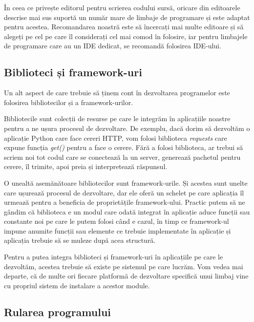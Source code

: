 În ceea ce privește editorul pentru scrierea codului sursă, oricare din
editoarele descrise mai sus suportă un număr mare de limbaje de programare și
este adaptat pentru acestea. Recomandarea noastră este să încercați mai multe
editoare și să alegeți pe cel pe care îl considerați cel mai comod în folosire,
iar pentru limbajele de programare care au un IDE dedicat, se recomandă
folosirea IDE-ului.

\subsection{Biblioteci și framework-uri}
\label{sec:appdev:dev:libs}

Un alt aspect de care trebuie să ținem cont în dezvoltarea programelor este
folosirea bibliotecilor și a framework-urilor.

Bibliotecile sunt colecții de resurse pe care le integrăm în aplicațiile noastre
pentru a ne ușura procesul de dezvoltare. De exemplu, dacă dorim să dezvoltăm o
aplicație Python care face cereri HTTP, vom folosi biblioteca \textit{requests} care expune funcția
\textit{get()} pentru a face o cerere. Fără a folosi biblioteca, ar trebui să
scriem noi tot codul care se conectează la un server, generează pachetul pentru
cerere, îl trimite, apoi preia și interpretează răspunsul.

O unealtă asemănătoare bibliotecilor sunt framework-urile. Și acestea sunt
unelte care ușurează procesul de dezvoltare, dar ele oferă un schelet pe care
aplicația îl urmează pentru a beneficia de proprietățile framework-ului. Practic
putem să ne gândim că biblioteca e un modul care odată integrat în aplicație
aduce funcții sau constante noi pe care le putem folosi când e cazul, în timp ce
framework-ul impune anumite funcții sau elemente ce trebuie implementate în
aplicație și aplicația trebuie să se muleze după acea structură.

Pentru a putea integra biblioteci și framework-uri în aplicațiile pe care le
dezvoltăm, acestea trebuie să existe pe sistemul pe care lucrăm. Vom vedea mai
departe, că de multe ori fiecare platformă de dezvoltare specifică unui limbaj
vine cu propriul sistem de instalare a acestor module.

\subsection{Rularea programului}
\label{sec:appdev:dev:run}

